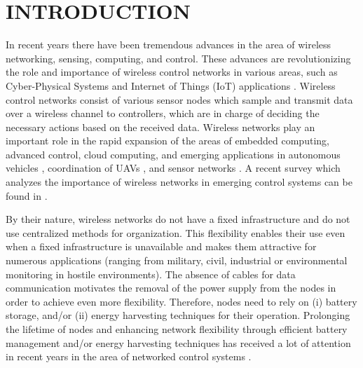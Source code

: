 \documentclass[twocolumn]{autart}    %
\begin{document}
%
%
%
%
\section{INTRODUCTION}\label{intro}


In recent years there have been tremendous advances in the area of wireless networking, sensing, computing, and control. 
These advances are revolutionizing the role and importance of wireless control networks in various areas, such as Cyber-Physical Systems \cite{2012:Sztipanovits} and Internet of Things (IoT) applications \cite{2016:Bello_Zeadally}. 
Wireless control networks consist of various sensor nodes which sample and transmit data over a wireless channel to controllers, which are in charge of deciding the necessary actions based on the received data. 
Wireless networks play an important role in the rapid expansion of the areas of embedded computing, advanced control, cloud computing, and emerging applications in autonomous vehicles \cite{2015:Alam_Besselink_Martensson_Johansson, 2016:Demir_Ergen}, coordination of UAVs \cite{2016:Nowzari_Pappas}, and sensor networks \cite{2013:Aziz_Ivanovich}. 
A recent survey which analyzes the importance of wireless networks in emerging control systems can be found in \cite{2018:Park_Ergen_Fischione_Lu_Johansson}. 



By their nature, wireless networks do not have a fixed infrastructure and do not use centralized methods for organization. 
This flexibility enables their use even when a fixed infrastructure is unavailable and makes them attractive for numerous applications (ranging from military, civil, industrial or environmental monitoring in hostile environments). 
The absence of cables for data communication motivates the removal of the power supply from the nodes in order to achieve even more flexibility. 
Therefore, nodes need to rely on (i) battery storage, and/or (ii) energy harvesting techniques for their operation.
Prolonging the lifetime of nodes and enhancing network flexibility through efficient battery management and/or energy harvesting techniques has received a lot of attention in recent years in the area of networked control systems \cite{2011:Park_Fischione_Bonivento_Johansson_Vincentelli, 2010:Ploennigs_Vasyutynskyy_Kabitzsch, 2019:Knorn_Dey_Ahlen_Quevedo, 2020:Ma_Lan_Hassan_Hu_Das, 2013:Aziz_Ivanovich}. 
\end{document}
